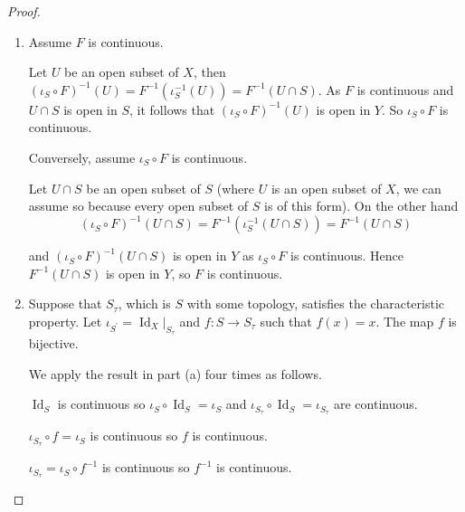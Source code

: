 \begin{proof}
    \begin{enumerate}[itemsep=0pt,label={(\alph*)}]
        \item Assume \( F \) is continuous.

              Let \( U \) be an open subset of \( X \), then \( {(\iota_{S} \circ F)}^{-1}(U) = F^{-1}(\iota_{S}^{-1}(U)) = F^{-1}(U \cap S) \). As \( F \) is continuous and \( U \cap S \) is open in \( S \), it follows that \( {(\iota_{S} \circ F)}^{-1}(U) \) is open in \( Y \). So \( \iota_{S} \circ F \) is continuous.

              Conversely, assume \( \iota_{S} \circ F \) is continuous.

              Let \( U \cap S \) be an open subset of \( S \) (where \( U \) is an open subset of \(X\), we can assume so because every open subset of \(S\) is of this form). On the other hand
              \[
                  {(\iota_{S} \circ F)}^{-1}(U \cap S) = F^{-1}(\iota_{S}^{-1}(U \cap S)) = F^{-1}(U \cap S)
              \]

              and \(  {(\iota_{S} \circ F)}^{-1}(U \cap S) \) is open in \( Y \) as \( \iota_{S} \circ F \) is continuous. Hence \( F^{-1}(U \cap S) \) is open in \( Y \), so \( F \) is continuous.
        \item Suppose that \( S_{\tau} \), which is \( S \) with some topology, satisfies the characteristic property. Let \( \iota_{S^{\prime}} = \operatorname{Id}_{X}\vert_{S_{\tau}} \) and \( f: S \to S_{\tau} \) such that \( f(x) = x \). The map \( f \) is bijective.

              We apply the result in part (a) four times as follows.

              \( \operatorname{Id}_{S} \) is continuous so \( \iota_{S} \circ \operatorname{Id}_{S} = \iota_{S} \) and \( \iota_{S_{\tau}} \circ \operatorname{Id}_{S} = \iota_{S_{\tau}} \) are continuous.

              \( \iota_{S_{\tau}} \circ f = \iota_{S} \) is continuous so \( f \) is continuous.

              \( \iota_{S_{\tau}} = \iota_{S} \circ f^{-1} \) is continuous so \( f^{-1} \) is continuous.


\end{enumerate}
\end{proof}
